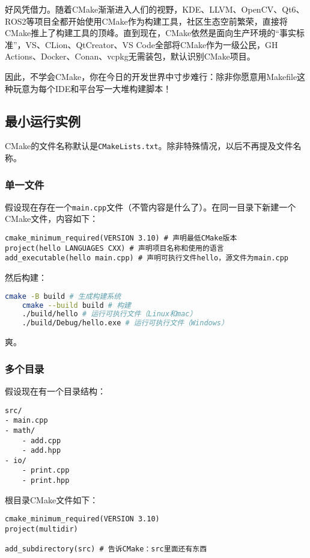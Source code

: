 好风凭借力。随着CMake渐渐进入人们的视野，KDE、LLVM、OpenCV、Qt6、ROS2等项目全都开始使用CMake作为构建工具，社区生态空前繁荣，直接将CMake推上了构建工具的顶峰。直到现在，CMake依然是面向生产环境的“事实标准”，VS、CLion、QtCreator、VS Code全部将CMake作为一级公民，GH Actions、Docker、Conan、vcpkg无需装包，默认识别CMake项目。

因此，不学会CMake，你在今日的开发世界中寸步难行：除非你愿意用Makefile这种玩意为每个IDE和平台写一大堆构建脚本！

\subsection{最小运行实例}

CMake的文件名称默认是\texttt{CMakeLists.txt}。除非特殊情况，以后不再提及文件名称。

\subsubsection{单一文件}

假设现在存在一个\texttt{main.cpp}文件（不管内容是什么了）。在同一目录下新建一个CMake文件，内容如下：

\begin{lstlisting}
cmake_minimum_required(VERSION 3.10) # 声明最低CMake版本
project(hello LANGUAGES CXX) # 声明项目名称和使用的语言
add_executable(hello main.cpp) # 声明可执行文件hello，源文件为main.cpp
\end{lstlisting}

然后构建：
\begin{lstlisting}[language=bash]
    cmake -B build # 生成构建系统
    cmake --build build # 构建
    ./build/hello # 运行可执行文件（Linux和mac）
    ./build/Debug/hello.exe # 运行可执行文件（Windows）
\end{lstlisting}

爽。

\subsubsection{多个目录}

假设现在有一个目录结构：
\begin{lstlisting}
src/
- main.cpp
- math/
    - add.cpp
    - add.hpp
- io/
    - print.cpp
    - print.hpp
\end{lstlisting}

根目录CMake文件如下：
\begin{lstlisting}
cmake_minimum_required(VERSION 3.10)
project(multidir)

add_subdirectory(src) # 告诉CMake：src里面还有东西
\end{lstlisting}

